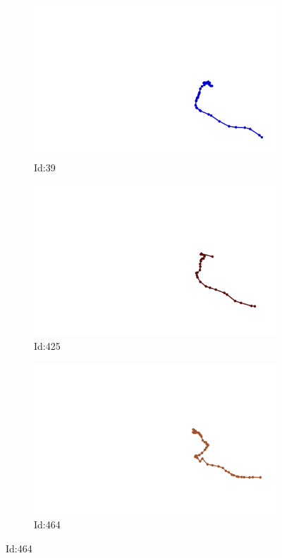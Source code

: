 \documentclass[12pt,twoside]{report}
\begin{document}
\begin{figure}
\centering
\begin{subfigure}[b]{0.20\textwidth}
\centering
\includegraphics[width=\textwidth]{../../trajectories/39.png}
\caption{Id:39}
\end{subfigure}
\begin{subfigure}[b]{0.20\textwidth}
\centering
\includegraphics[width=\textwidth]{../../trajectories/425.png}
\caption{Id:425}
\end{subfigure}
\begin{subfigure}[b]{0.20\textwidth}
\centering
\includegraphics[width=\textwidth]{../../trajectories/464.png}
\caption{Id:464}
\end{subfigure}
\end{figure}
\end{document}
